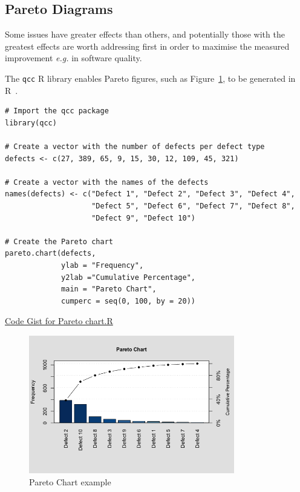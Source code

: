 \hypertarget{pareto.diagrams.in.r}{}
\subsection{Pareto Diagrams}
Some issues have greater effects than others, and potentially those with the greatest effects are worth addressing first in order to maximise the measured improvement \emph{e.g.} in software quality.

The \texttt{qcc} R library enables Pareto figures, such as Figure~\ref{fig:pareto_chart_example}, to be generated in R~\cite{7_basic_quality_tools_with_R}. 

\begin{lstlisting}
# Import the qcc package
library(qcc)                  

# Create a vector with the number of defects per defect type
defects <- c(27, 389, 65, 9, 15, 30, 12, 109, 45, 321)            

# Create a vector with the names of the defects 
names(defects) <- c("Defect 1", "Defect 2", "Defect 3", "Defect 4",
                    "Defect 5", "Defect 6", "Defect 7", "Defect 8",
                    "Defect 9", "Defect 10")   

# Create the Pareto chart
pareto.chart(defects,
             ylab = "Frequency",
             y2lab ="Cumulative Percentage",
             main = "Pareto Chart",
             cumperc = seq(0, 100, by = 20))
\end{lstlisting}
\href{https://gist.githubusercontent.com/rsalaza4/a69615daba7c7c56290838b46cc121cc/raw/974774009f38d6af534168f2a324ce2b3c61d632/Pareto\%20chart.R}{Code Gist for Pareto chart.R}
\begin{figure}[htbp!]
    \centering
    \includegraphics[width=0.8\textwidth]{images/Pareto_chart_example.png}
    \caption{Pareto Chart example}
    \label{fig:pareto_chart_example}
\end{figure}

